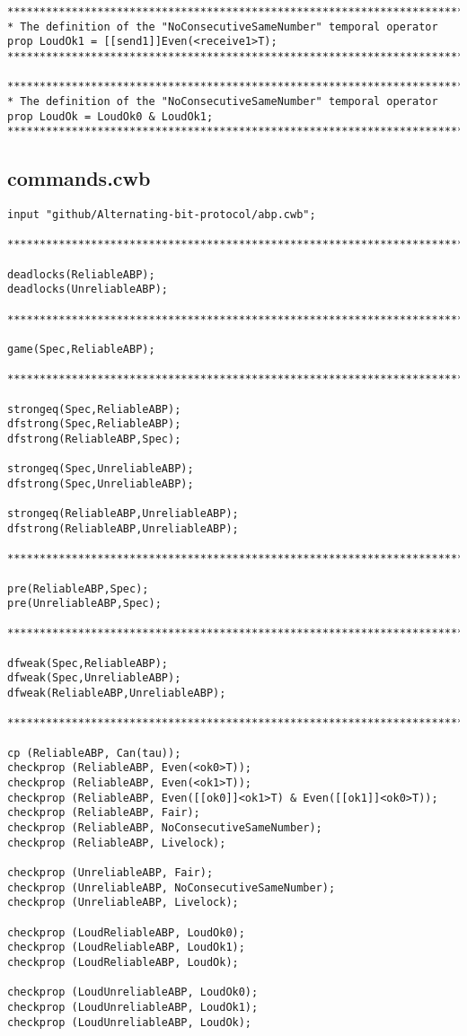 \begin{lstlisting}[breaklines]
*******************************************************************************
* The definition of the "NoConsecutiveSameNumber" temporal operator
prop LoudOk1 = [[send1]]Even(<receive1>T);
*******************************************************************************

*******************************************************************************
* The definition of the "NoConsecutiveSameNumber" temporal operator
prop LoudOk = LoudOk0 & LoudOk1;
*******************************************************************************
\end{lstlisting}

\subsection{commands.cwb}\label{sec:cwb-commands}
\begin{lstlisting}[breaklines]
input "github/Alternating-bit-protocol/abp.cwb";

*******************************************************************************

deadlocks(ReliableABP);
deadlocks(UnreliableABP);

*******************************************************************************

game(Spec,ReliableABP);

*******************************************************************************

strongeq(Spec,ReliableABP);
dfstrong(Spec,ReliableABP);
dfstrong(ReliableABP,Spec);

strongeq(Spec,UnreliableABP);
dfstrong(Spec,UnreliableABP);

strongeq(ReliableABP,UnreliableABP);
dfstrong(ReliableABP,UnreliableABP);

*******************************************************************************

pre(ReliableABP,Spec);
pre(UnreliableABP,Spec);

*******************************************************************************

dfweak(Spec,ReliableABP);
dfweak(Spec,UnreliableABP);
dfweak(ReliableABP,UnreliableABP);

*******************************************************************************

cp (ReliableABP, Can(tau));
checkprop (ReliableABP, Even(<ok0>T));
checkprop (ReliableABP, Even(<ok1>T));
checkprop (ReliableABP, Even([[ok0]]<ok1>T) & Even([[ok1]]<ok0>T));
checkprop (ReliableABP, Fair);
checkprop (ReliableABP, NoConsecutiveSameNumber);
checkprop (ReliableABP, Livelock);

checkprop (UnreliableABP, Fair);
checkprop (UnreliableABP, NoConsecutiveSameNumber);
checkprop (UnreliableABP, Livelock);

checkprop (LoudReliableABP, LoudOk0);
checkprop (LoudReliableABP, LoudOk1);
checkprop (LoudReliableABP, LoudOk);

checkprop (LoudUnreliableABP, LoudOk0);
checkprop (LoudUnreliableABP, LoudOk1);
checkprop (LoudUnreliableABP, LoudOk);
\end{lstlisting}

